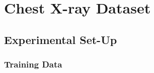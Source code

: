 \documentclass[12pt]{article}
\begin{document}




\section{Chest X-ray Dataset}

\subsection{Experimental Set-Up}



\subsubsection{Training Data}
\end{document}
